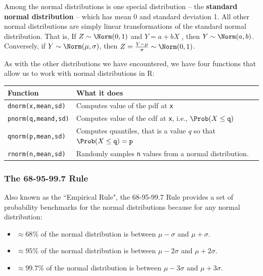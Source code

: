 \documentclass[twoside]{book}\usepackage[]{graphicx}\usepackage[]{xcolor}
\def\R{{\sf R}}
\def\term#1{\textbf{#1}}
\begin{document}
Among the normal distributions is one special distribution -- the \term{standard normal
distribution} -- which has mean 0 and standard deviation 1. All other normal 
distributions are simply linear transformations of the standard normal distribution.
That is,
If $Z \sim \Norm(0,1)$ and $Y = a + b X$ , then $Y \sim \Norm(a, b)$.  Conversely,
if $Y \sim \Norm(\mu, \sigma)$, then $Z = \frac{ Y - \mu }{\sigma} \sim \Norm(0,1)$.

As with the other distributions we have encountered, we have four functions
that allow us to work with normal distributions in \R:

\begin{center}
\begin{tabular}{ll}
	\hline
	Function & What it does \\
	\hline
	\texttt{dnorm(x,mean,sd)} & Computes value of the pdf at \texttt{x}
	\\
	\texttt{pnorm(q,meand,sd)} 
		& Computes value of the cdf at \texttt{x}, i.e., 
	$\Prob(X \le \texttt{q})$
	\\
	\texttt{qnorm(p,mean,sd)} 
		& Computes quantiles, that is a value $q$ so that 
	$\Prob(X \le \texttt{q}) = \texttt{p}$
    \\
	\texttt{rnorm(n,mean,sd)} & Randomly samples \texttt{n} values from a
	normal distribution.
	\\
	\hline
\end{tabular}
\end{center}

\subsubsection{The 68-95-99.7 Rule}

Also known as the ``Empirical Rule", the 68-95-99.7 Rule provides a set of probability
benchmarks for the normal distributions because for any normal distribution: 
\begin{itemize} 
	\item
		$\approx 68$\% of the normal distribution is between 
		$\mu-\sigma$ and $\mu + \sigma$.
	\item
		$\approx 95$\% of the normal distribution is between 
		$\mu- 2\sigma$ and $\mu + 2\sigma$.
	\item
		$\approx 99.7$\% of the normal distribution is between 
		$\mu- 3\sigma$ and $\mu + 3\sigma$.
\end{itemize} 
\end{document}
